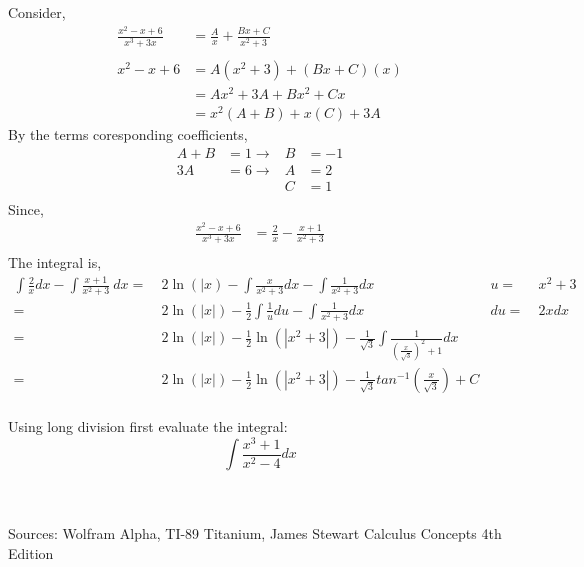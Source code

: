 \documentclass[10pt,letterpaper,cm]{hmcpset}
\begin{document}
Consider,\\
\begin{align*}
  \frac{x^2 - x + 6}{x^3+3x} &= \frac{A}{x} + \frac{Bx+C}{x^2+3}\\
  \\x^2-x+6&=A(x^2+3)+(Bx+C)(x)\\
           &=Ax^2+3A+Bx^2+Cx\\
           &=x^2(A+B)+x(C) + 3A
\end{align*}
By the terms coresponding coefficients,
\begin{align*}
          A+B &= 1 \rightarrow& B&=-1\\
          3A  &=6 \rightarrow& A&=2\\  
           && C &=1\\
\end{align*}
Since,
\begin{align*}
  \frac{x^2 - x + 6}{x^3+3x} &= \frac{2}{x} - \frac{x+1}{x^2+3}\\
\end{align*}
The integral is,
\begin{align*}
  \int\frac{2}{x}dx - \int\frac{x+1}{x^2+3}~dx =&~2\ln(|x) - \int\frac{x}{x^2+3}dx
  - \int\frac{1}{x^2+3}dx &u=&~x^2+3 \\
  =&~2\ln\left( |x| \right)-\frac{1}{2}\int\frac{1}{u}du
  - \int\frac{1}{x^2+3}dx &du=&~2xdx \\
  =&~2\ln\left( |x| \right)-\frac{1}{2} \ln(|x^2+3|)
  - \frac{1}{\sqrt{3}}\int\frac{1}{\left( \frac{x}{\sqrt{3}} \right)^2+1} dx \\
  =&~2\ln\left( |x| \right)-\frac{1}{2} \ln(|x^2+3|)
  - \frac{1}{\sqrt{3}}tan^{-1}\left( \frac{x}{\sqrt{3}}\right) + C \\
\end{align*}

\newpage
\begin{problem}[4]
  Using long division first evaluate the integral:
  \begin{equation*}
    \int\frac{x^3 + 1}{x^2-4}dx 
  \end{equation*}
\end{problem}\\
\\
Sources: Wolfram Alpha, TI-89 Titanium, James Stewart Calculus Concepts 4th Edition
\end{document}
